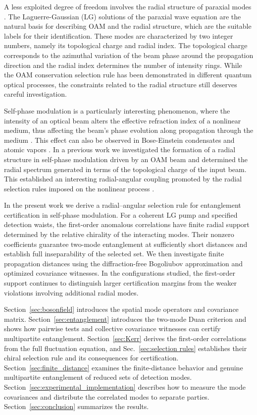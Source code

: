 \documentclass[%
 reprint,
 amsmath,amssymb,
 aps,
pra,
twocolumn,
]{revtex4-2}
\begin{document}
A less exploited degree of freedom involves the radial structure of paraxial modes \cite{Pereira2017,Buono2020,Zhi-Han2020,Sonja2021,AOliveira2021,Kotlyar2022}. The Laguerre-Gaussian (LG) solutions of the paraxial wave equation are the natural basis for describing OAM and the radial structure, which are the suitable labels for their identification. These modes are characterized by two integer numbers, namely its topological charge and radial index. The topological charge corresponds to the azimuthal variation of the beam phase around the propagation direction and the radial index determines the number of intensity rings.
While the OAM conservation selection rule has been demonstrated in different quantum optical processes, the constraints related to the radial structure still deserves careful investigation.

Self-phase modulation is a particularly interesting phenomenon, where the intensity of an optical beam alters the effective refraction index of a nonlinear medium, thus affecting the beam's phase evolution along propagation through the medium \cite{Cerda2010}. This effect can also be observed in Bose-Einstein condensates and atomic vapors \cite{BEC-RMP-1999,Mendonca2005,GLORIEUX2025}.
In a previous work we investigated the formation of a radial structure in self-phase modulation driven by an OAM beam and determined the radial spectrum generated in terms of the topological charge of the input beam. This established an interesting radial-angular coupling promoted by the radial selection rules imposed on the nonlinear process \cite{Oliveira2023}.

In the present work we derive a radial--angular selection rule for entanglement certification in self-phase modulation. For a coherent LG pump and specified detection waists, the first-order anomalous correlations have finite radial support determined by the relative chirality of the interacting modes. Their nonzero coefficients guarantee two-mode entanglement at sufficiently short distances and establish full inseparability of the selected set. We then investigate finite propagation distances using the diffraction-free Bogoliubov approximation and optimized covariance witnesses. In the configurations studied, the first-order support continues to distinguish larger certification margins from the weaker violations involving additional radial modes.

Section~\ref{sec:bosonfield} introduces the spatial mode operators and covariance matrix. Section~\ref{sec:entanglement} introduces the two-mode Duan criterion and shows how pairwise tests and collective covariance witnesses can certify multipartite entanglement. Section~\ref{sec:Kerr} derives the first-order correlations from the full fluctuation equation, and Sec.~\ref{sec:selection rules} establishes their chiral selection rule and its consequences for certification. Section~\ref{sec:finite_distance} examines the finite-distance behavior and genuine multipartite entanglement of reduced sets of detection modes. Section~\ref{sec:experimental_implementation} describes how to measure the mode covariances and distribute the correlated modes to separate parties. Section~\ref{sec:conclusion} summarizes the results.
\end{document}
